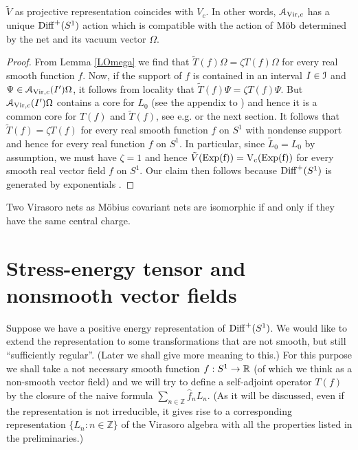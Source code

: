 \documentclass[12pt]{article}
\begin{document}
\begin{theorem}
\label{uniqvir}
$\tilde{V}$ as projective representation coincides with $V_{c}$. 
In other words, ${\mathcal A}_{{\rm Vir},c}$ has a unique ${{\rm Diff}^+(S^1)}$ action which is
compatible with the action of $\text {M\"{o}b}$ determined by the net and its
vacuum vector $\Omega$.
\end{theorem}
\begin{proof} 
From Lemma \ref{LOmega} we find that $\tilde{T}(f)\Omega =\zeta T(f)\Omega$ 
for every real smooth function $f$. Now, if the support of $f$ is contained in 
an interval $I\in {\mathcal I}$ and $\Psi \in {\mathcal A}_{{\rm Vir},c}(I')\Omega$, it
follows 
from locality that $\tilde{T}(f)\Psi =\zeta T(f)\Psi$. But 
${\mathcal A}_{{\rm Vir},c}(I')\Omega$ contains a core for $L_0$ (see the appendix
to 
\cite{Carpi99b}) and hence it is a common core for $T(f)$ and
$\tilde{T}(f)$, see e.g. \cite{BS-M} or the next section.
It follows that $\tilde{T}(f) =\zeta T(f)$ for every real smooth function $f$ 
on $S^1$ with nondense support and hence for every real
function $f$ on $S^1$. In particular, since $\tilde{L}_0=L_0$ by
assumption, we must have $\zeta=1$ and hence 
$\tilde{V}(\rm{Exp}(f))=V_{c}(\rm{Exp}(f))$ for every 
smooth real vector field $f$ on $S^1$. Our claim then follows because
${{\rm Diff}^+(S^1)}$ is generated by exponentials \cite{Milnor}.
\end{proof}

\begin{corollary}
\label{isovirnets} 
Two Virasoro nets as M\"obius covariant nets are isomorphic if and only 
if they have the same central charge.
\end{corollary}

\section{Stress-energy tensor and nonsmooth vector fields}
\label{sectestimates}
Suppose we have a positive energy representation of
${{\rm Diff}^+(S^1)}$. We would like to extend the representation to some
transformations that are not smooth, but still ``sufficiently regular''.
(Later we shall give more meaning to this.) For this purpose we shall
take a not necessary smooth function $f:S^1 \rightarrow {\mathbb R}$ (of which we
think as a non-smooth vector field) and we will try to define a
self-adjoint operator $T(f)$ by the closure of the naive formula
$\mathop{\sum}_{n \in {\mathbb Z}} \hat{f}_n L_n$.
(As it will be discussed, even if the representation is not irreducible,
it gives rise to a corresponding representation $\{L_n: n \in {\mathbb
Z}\}$ of the Virasoro algebra with all the properties listed in the
preliminaries.)
\end{document}
